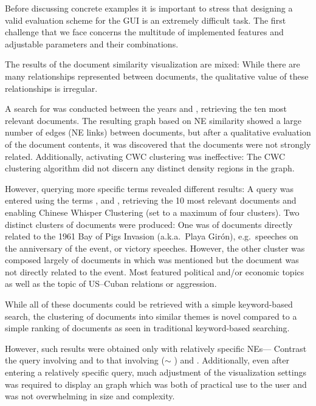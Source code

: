 Before discussing concrete examples it is important to stress that designing a valid evaluation scheme for the GUI is an extremely difficult task. The first challenge that we face concerns the multitude of implemented features and adjustable parameters and their combinations. 

The results of the document similarity visualization are mixed: While there are many relationships represented between documents, the qualitative value of these relationships is irregular.

A search for  was conducted between the years  and , retrieving the ten most relevant documents. The resulting graph based on NE similarity showed a large number of 
edges (NE links) between documents, but after a qualitative evaluation of the document contents, it was discovered that the documents were not strongly related. Additionally, activating CWC clustering was ineffective: The CWC clustering algorithm did not discern any distinct density regions in the graph.

However, querying more specific terms revealed different results: A query was entered using the terms , and , retrieving the 10 most relevant documents and enabling Chinese Whisper Clustering (set to a maximum of four clusters). Two distinct clusters of documents were produced: One was of documents directly related to the 1961 Bay of Pigs Invasion (a.k.a.\ Playa Gir\'{o}n), e.g.\ speeches on the anniversary of the event, or victory speeches. However, the other cluster was composed largely of documents in which  was mentioned but the document was not directly related to the event. Most featured political and/or economic topics as well as the topic of US--Cuban relations or aggression.

While all of these documents could be retrieved with a simple keyword-based search, the clustering of documents into similar themes is novel compared to a simple ranking of documents as seen in traditional keyword-based searching.

However, such results were obtained only with relatively specific NEs--- Contrast the query involving  and  to that involving  ($\sim$ )  and . Additionally, even after entering a relatively specific query, much adjustment of the visualization settings was required to display an graph which was both of practical use to the user and was not overwhelming in size and complexity.
